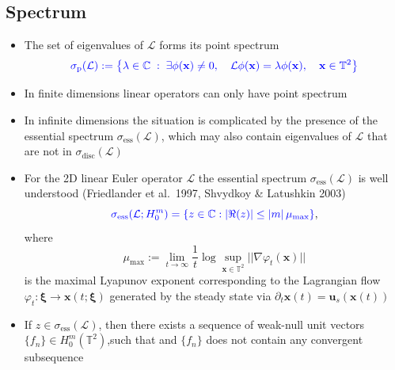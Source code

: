 \documentclass{beamer}
\def\Bmp#1{ \begin{minipage}{#1} }
\def\Emp{ \end{minipage} }
\def\L{{\mathcal{L}}}
\def\CC{{\mathbb{C}}}
\def\TT{{\mathbb{T}}}
\def\blue#1{{\color{blue}{ #1 }}}
\def\x{{\bf x}}
\newcommand{\bds}{\boldsymbol}
\newcommand{\mbb}[1]{\mathbb{#1}}
\def\bxi{\boldsymbol{\xi}}
\newcommand{\sigdis}{\sigma_{\text{disc}}}
\newcommand{\sigess}{\sigma_{\text{ess}}}
\def\sigp{\sigma_{\text{p}}}
\def\mumax{\mu_{\text{max}}}
\begin{document}
\subsection{Spectrum}
\frame
{
\hspace*{-0.75cm}
\Bmp{12cm}
\raggedright

\begin{itemize}
\item<1-> 
The set of eigenvalues of $\L$ forms its point spectrum
\begin{equation*}
\blue{{\sigp(\L) := \left\{ \lambda \in \CC \; : \; \exists \phi (\x) \neq 0,  \quad \L \phi (\x) = \lambda \phi (\x), \quad \x \in \TT^2  \right\}}}
\end{equation*}

\bigskip
\item<2->
In finite dimensions linear operators can only have point spectrum

\bigskip
\item<3-> In infinite dimensions the situation is complicated by the
  presence of the essential spectrum $\sigess(\L)$, which may also contain
  eigenvalues of $\L$ that are not in $\sigdis(\L)$

\end{itemize}

     
\Emp
}



\frame
{
\hspace*{-0.75cm}
\Bmp{12cm}
\raggedright

\begin{itemize}
\item<1-> For the 2D linear Euler operator $\L$ the essential spectrum
  $\sigess(\L)$ is well understood (Friedlander et al.~1997, Shvydkoy
  \& Latushkin 2003)
\begin{equation*}
  \blue{\sigess(\L; H^{m}_0) = \{ z\in \CC: |\Re(z)| \leq |m| \, \mumax \}},
\end{equation*}
where 
\begin{equation*}
\mumax :=  \lim_{t\to\infty} \frac{1}{t}\log \sup_{\bds x\in\mbb T^2} ||\nabla \varphi_t(\bds x)||
\end{equation*}
is the maximal Lyapunov exponent corresponding
to the Lagrangian flow $\varphi_t: \bxi \to \bds x(t; \bxi)$ generated
by the steady state via $\partial_t \bds x(t) = \bds u_s (\bds x(t))$

\medskip
\item<2-> If $z \in \sigess(\L)$, then there exists a sequence of
  weak-null unit vectors
  ${\{f_n\} \in H^m_0(\TT^2)}$,\/\blue{approximate eigenvectors,}\/such
  that
  \blue{$$\|(\L - z) f_n \|_{H^m} \rightarrow 0, \qquad n \rightarrow
    \infty$$} and $\{f_n\}$ does not contain any convergent
  subsequence
\end{itemize}

     
\Emp
}
\end{document}
